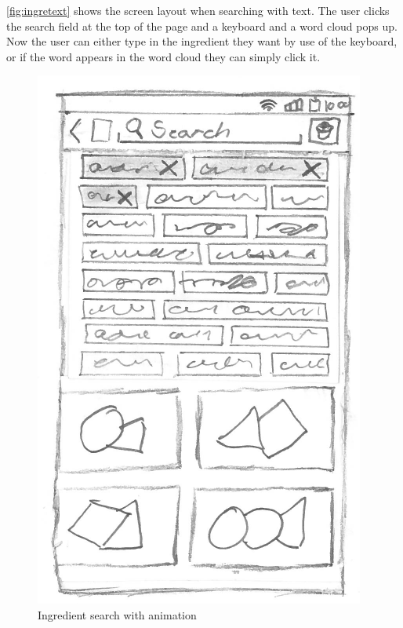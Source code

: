 \autoref{fig:ingretext} shows the screen layout when searching with text. The user clicks the search field at the top of the page and a keyboard and a word cloud pops up. Now the user can either type in the ingredient they want by use of the keyboard, or if the word appears in the word cloud they can simply click it. 

\begin{figure}[H]
\begin{minipage}[b]{0.5\columnwidth}
\centering
\includegraphics[width=0.7\columnwidth]{img/prototypes/ingredient_search_animation.pdf}
\caption{Ingredient search with animation\label{fig:ingreani}}
\end{minipage}
\hspace{0.5cm}
\begin{minipage}[b]{0.5\columnwidth}
\centering

\end{minipage}
\end{figure}

